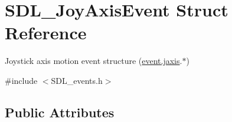 \hypertarget{struct_s_d_l___joy_axis_event}{}\section{S\+D\+L\+\_\+\+Joy\+Axis\+Event Struct Reference}
\label{struct_s_d_l___joy_axis_event}


Joystick axis motion event structure (\hyperlink{union_s_d_l___event_ac4611acd0e9c675e67dc20919f0accb4}{event.\+jaxis}.$\ast$)  




{\ttfamily \#include $<$S\+D\+L\+\_\+events.\+h$>$}

\subsection*{Public Attributes}
